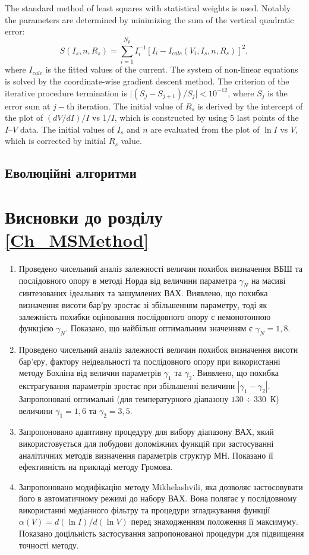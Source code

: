 \documentclass[a4paper,14pt,oneside,openany]{memoir}
\begin{document}
The standard method of least squares with statistical weights is used.
Notably the parameters are determined by minimizing the sum of the vertical quadratic error:
\begin{equation}
\label{eqLS}
S(I_s,n,R_s)=\sum_{i=1}^{N_p}I_i^{-1}\left[I_i-I_{calc}(V_i,I_s,n,R_s)\right]^2,
\end{equation}
where $I_{calc}$ is the fitted values of the current.
The system of non-linear equations is solved by the coordinate-wise gradient descent method.
The criterion of the iterative procedure termination is $\mid(S_j-S_{j+1})/S_j\mid<10^{-12}$,
where $S_j$ is the error sum at $j-$th iteration.
The initial value of $R_s$ is derived by the intercept of the plot of $(dV/dI)/I$ vs $1/I$, which is constructed by using 5 last points of the $I$--$V$ data.
The initial values of $I_s$ and $n$ are evaluated from the plot of $\ln I$ vs $V$, which is corrected by initial $R_s$ value.

\subsection{Еволюційні алгоритми}


\section*{Висновки до розділу \ref{Ch_MSMethod}}
  \begin{enumerate}
     \item Проведено чисельний аналіз залежності величин похибок визначення ВБШ та послідовного опору в методі Норда від величини параметра $\gamma_N$ на масиві синтезованих ідеальних та зашумлених ВАХ.
     Виявлено, що похибка визначення висоти бар'ру зростає зі збільшенням параметру, тоді як залежність похибки оцінювання послідовного опору є немонотонною функцією $\gamma_N$.
     Показано, що найбільш оптимальним значенням є $\gamma_N=1,8$.
     \item Проведено чисельний аналіз залежності величин похибок визначення висоти бар'єру, фактору неідеальності та послідовного опору при використанні методу Бохліна від величин параметрів $\gamma_1$ та $\gamma_2$.
     Виявлено, що похибка екстрагування параметрів зростає при збільшенні величини $|\gamma_1-\gamma_2|$.
     Запропоновані оптимальні (для температурного діапазону $130\div330$~К) величини $\gamma_1=1,6$ та $\gamma_2=3,5$.
     \item Запропоновано адаптивну процедуру для вибору діапазону ВАХ, який використовується для побудови допоміжних функцій при застосуванні аналітичних методів визначення параметрів структур МН.
         Показано її ефективність на прикладі методу Громова.
     \item Запропоновано модифікацію методу Mikhelashvili, яка дозволяє застосовувати його в автоматичному режимі до набору ВАХ.
     Вона полягає у послідовному використанні медіанного фільтру та процедури згладжування функції $\alpha(V)=d(\ln I)/d(\ln V)$ перед знаходженням положення її максимуму.
     Показано доцільність застосування запропонованої процедури для підвищення точності методу.
  \end{enumerate}
\end{document}
